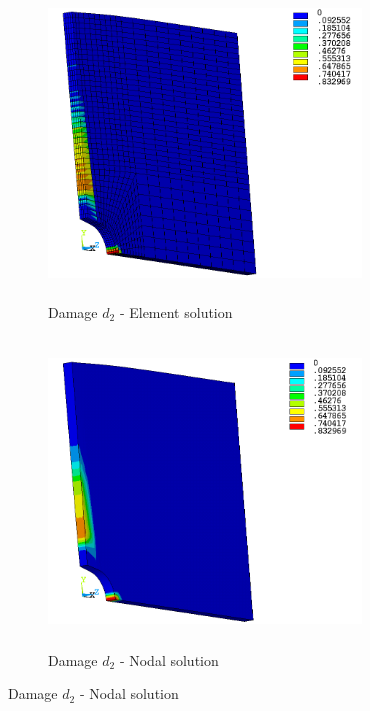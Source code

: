 \documentclass[12pt,twoside]{report}
\begin{document}
\begin{figure}[htbp!]\ContinuedFloat     
     \begin{subfigure}[b]{0.4\textwidth}
        \includegraphics[width=8.3cm,height=8.2cm,keepaspectratio]{27.d2-lt-e.png}
         \caption{Damage $d_{2}$ - Element solution}
         \label{fig:d2-lt-e}
     \end{subfigure}
    \hspace{1.8cm}
      \begin{subfigure}[b]{0.4\textwidth}
         \includegraphics[width=8.3cm,height=8.2cm,keepaspectratio]{27.d2-lt-n.png}
         \caption{Damage $d_{2}$ - Nodal solution}
         \label{fig:d2-lt-n}
     \end{subfigure}
\end{figure}
\FloatBarrier
\end{document}
